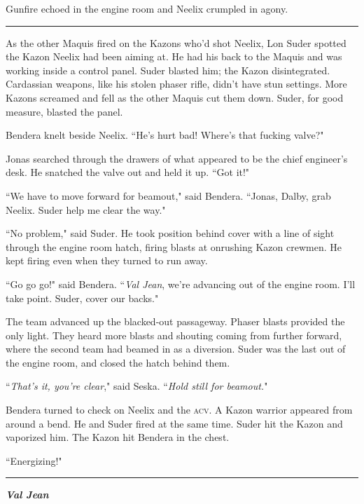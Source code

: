\documentclass[twoside,letterpaper,12pt]{memoir}
\begin{document}
Gunfire echoed in the engine room and Neelix crumpled in agony.

\begin{center}\rule{3cm}{0.4 pt}\end{center}

As the other Maquis fired on the Kazons who'd shot Neelix, Lon Suder spotted the Kazon Neelix had been aiming at. He had his back to the Maquis and was working inside a control panel. Suder blasted him; the Kazon disintegrated. Cardassian weapons, like his stolen phaser rifle, didn't have stun settings. More Kazons screamed and fell as the other Maquis cut them down. Suder, for good measure, blasted the panel.

Bendera knelt beside Neelix. ``He's hurt bad! Where's that fucking valve?"

Jonas searched through the drawers of what appeared to be the chief engineer's desk. He snatched the valve out and held it up. ``Got it!"

``We have to move forward for beamout," said Bendera. ``Jonas, Dalby, grab Neelix. Suder help me clear the way."

``No problem," said Suder. He took position behind cover with a line of sight through the engine room hatch, firing blasts at onrushing Kazon crewmen. He kept firing even when they turned to run away.

``Go go go!" said Bendera. ``\textit{Val Jean}, we're advancing out of the engine room. I'll take point. Suder, cover our backs."

The team advanced up the blacked-out passageway. Phaser blasts provided the only light. They heard more blasts and shouting coming from further forward, where the second team had beamed in as a diversion. Suder was the last out of the engine room, and closed the hatch behind them.

``\textit{That's it, you're clear}," said Seska. ``\textit{Hold still for beamout.}"

Bendera turned to check on Neelix and the \textsc{acv}. A Kazon warrior appeared from around a bend. He and Suder fired at the same time. Suder hit the Kazon and vaporized him. The Kazon hit Bendera in the chest.

``Energizing!"

\begin{center}\rule{3cm}{0.4 pt}\end{center}

\noindent\textit{\textbf{Val Jean}}\\
\end{document}
